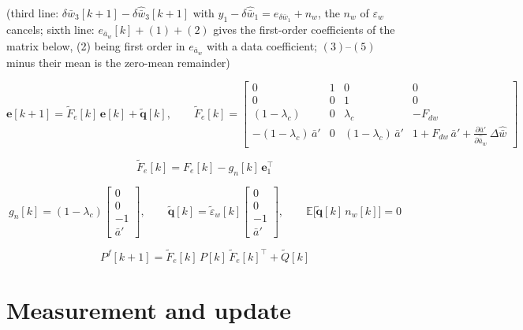 \documentclass[11pt,a4paper,fontset=none]{ctexart}
\newcommand{\ba}{\bar{a}}
\newcommand{\bw}{\bar{w}}
\newcommand{\E}{\mathbb{E}}
\newcommand{\dWh}{\Delta\hat{\bw}}
\newcommand{\ap}{\ba'}
\newcommand{\et}{\tilde{\varepsilon}_w}
\begin{document}
(third line: $\delta\bw_3[k+1] - \delta\hat{\bw}_3[k+1]$ with $y_1 - \delta\hat{\bw}_1 = e_{\delta\bw_1} + n_w$, the $n_w$ of $\varepsilon_w$ cancels;
sixth line: $e_{\ba_w}[k] + (1) + (2)$ gives the first-order coefficients of the matrix below, (2) being first order in $e_{\ba_w}$ with a data coefficient;
$(3)$--$(5)$ minus their mean is the zero-mean remainder)

\begin{equation*}
\mathbf{e}[k+1] = \tilde{F}_e[k]\,\mathbf{e}[k] + \tilde{\mathbf{q}}[k], \qquad
\tilde{F}_e[k] =
\begin{bmatrix}
0 & 1 & 0 & 0 \\
0 & 0 & 1 & 0 \\
(1-\lambda_c) & 0 & \lambda_c & -F_{dw} \\
-(1-\lambda_c)\,\ap & 0 & (1-\lambda_c)\,\ap & 1 + F_{dw}\,\ap + \tfrac{\partial\ap}{\partial\hat{\ba}_w}\,\dWh
\end{bmatrix}
\end{equation*}

\begin{equation*}
\tilde{F}_e[k] = F_e[k] - g_n[k]\,\mathbf{e}_1^{\top}
\end{equation*}

\begin{equation*}
g_n[k] = (1-\lambda_c)\begin{bmatrix} 0 \\ 0 \\ -1 \\ \ap \end{bmatrix} , \qquad
\tilde{\mathbf{q}}[k] = \et[k]\begin{bmatrix} 0 \\ 0 \\ -1 \\ \ap \end{bmatrix} , \qquad
\E\bigl[\tilde{\mathbf{q}}[k]\,n_w[k]\bigr] = 0
\end{equation*}

\begin{equation*}
P^{f}[k+1] = \tilde{F}_e[k]\,P[k]\,\tilde{F}_e[k]^{\top} + \tilde{Q}[k]
\end{equation*}

\section{Measurement and update}
\end{document}

